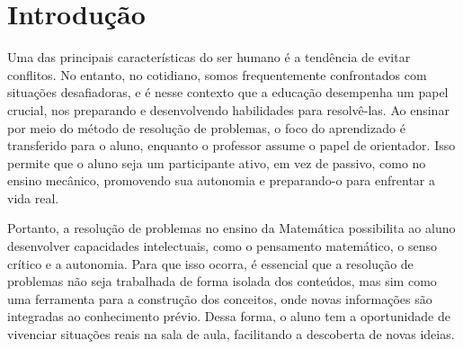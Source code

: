 




\pretextual{} %

\imprimircapa{} %
\imprimirfolhaderosto{} %













\textual{} %

\chapter{Introdução} \label{cap:1_introducao}

Uma das principais características do ser humano é a tendência de evitar conflitos. No entanto, no cotidiano, somos frequentemente confrontados com situações desafiadoras, e é nesse contexto que a educação desempenha um papel crucial, nos preparando e desenvolvendo habilidades para resolvê-las. Ao ensinar por meio do método de resolução de problemas, o foco do aprendizado é transferido para o aluno, enquanto o professor assume o papel de orientador. Isso permite que o aluno seja um participante ativo, em vez de passivo, como no ensino mecânico, promovendo sua autonomia e preparando-o para enfrentar a vida real.

Portanto, a resolução de problemas no ensino da Matemática possibilita ao aluno desenvolver capacidades intelectuais, como o pensamento matemático, o senso crítico e a autonomia. Para que isso ocorra, é essencial que a resolução de problemas não seja trabalhada de forma isolada dos conteúdos, mas sim como uma ferramenta para a construção dos conceitos, onde novas informações são integradas ao conhecimento prévio. Dessa forma, o aluno tem a oportunidade de vivenciar situações reais na sala de aula, facilitando a descoberta de novas ideias.

